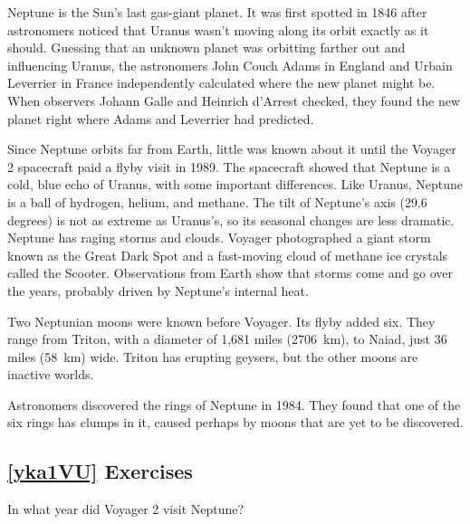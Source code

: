 \documentclass{article}
\numberwithin{equation}{section}
\numberwithin{figure}{section}
\begin{document}
\begin{displayquote}
    Neptune is the Sun's last gas-giant planet. It was first spotted in 1846 after astronomers noticed that Uranus wasn't moving along its orbit exactly as it should. Guessing that an unknown planet was orbitting farther out and influencing Uranus, the astronomers John Couch Adams in England and Urbain Leverrier in France independently calculated where the new planet might be. When observers Johann Galle and Heinrich d'Arrest checked, they found the new planet right where Adams and Leverrier had predicted.

    \vspace{1em}

    Since Neptune orbits far from Earth, little was known about it until the Voyager 2 spacecraft paid a flyby visit in 1989. The spacecraft showed that Neptune is a cold, blue echo of Uranus, with some important differences. Like Uranus, Neptune is a ball of hydrogen, helium, and methane. The tilt of Neptune's axis (29.6 degrees) is not as extreme as Uranus's, so its seasonal changes are less dramatic. Neptune has raging storms and clouds. Voyager photographed a giant storm known as the Great Dark Spot and a fast-moving cloud of methane ice crystals called the Scooter. Observations from Earth show that storms come and go over the years, probably driven by Neptune's internal heat. 

    \vspace{1em}

    Two Neptunian moons were known before Voyager. Its flyby added six. They range from Triton, with a diameter of 1,681 miles (\SI{2706}{km}), to Naiad, just 36 miles (\SI{58}{km}) wide. Triton has erupting geysers, but the other moons are inactive worlds.

    \vspace{1em}

    Astronomers discovered the rings of Neptune in 1984. They found that one of the six rings has clumps in it, caused perhaps by moons that are yet to be discovered.
\end{displayquote}

\subsection*{\ref{yka1VU} Exercises}

\begin{exercise}
    In what year did Voyager 2 visit Neptune?
\end{exercise}
\end{document}
